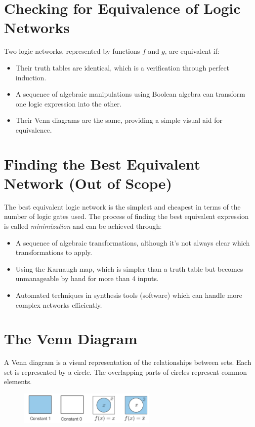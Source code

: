 \documentclass[12pt,openany, tikz,border=10pt]{book}
\begin{document}
  \newpage
  \section*{Checking for Equivalence of Logic Networks}

  Two logic networks, represented by functions \( f \) and \( g \), are equivalent if:
  \begin{itemize}
    \item[] Their truth tables are identical, which is a verification through perfect induction.
    \item[] A sequence of algebraic manipulations using Boolean algebra can transform one logic expression into the other.
    \item[] Their Venn diagrams are the same, providing a simple visual aid for equivalence.
  \end{itemize}
  
  \section*{Finding the Best Equivalent Network (Out of Scope)}
  
  The best equivalent logic network is the simplest and cheapest in terms of the number of logic gates used. The process of finding the best equivalent expression is called \emph{minimization} and can be achieved through:
  \begin{itemize}
    \item[] A sequence of algebraic transformations, although it's not always clear which transformations to apply.
    \item[] Using the Karnaugh map, which is simpler than a truth table but becomes unmanageable by hand for more than 4 inputs.
    \item[] Automated techniques in synthesis tools (software) which can handle more complex networks efficiently.
  \end{itemize}
  
\section{The Venn Diagram}
A Venn diagram is a visual representation of the relationships between sets. Each set is represented by a circle. The overlapping parts of circles represent common elements.

\begin{figure}[htp] %
    \centering
    \includegraphics[width=0.60\textwidth]{circuits/6.5.png}

  \end{figure}
\end{document}
